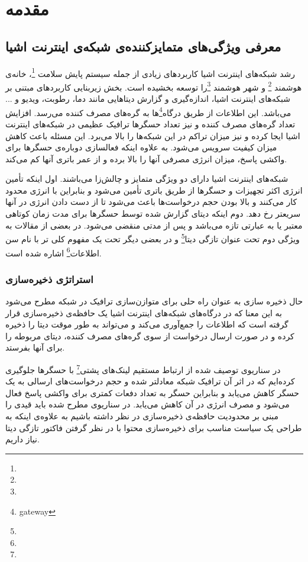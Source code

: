 
\chapter{مقدمه}
\section{معرفی ویژگی‌های متمایزکننده‌ی شبکه‌ی اینترنت اشیا}
رشد شبکه‌های اینترنت اشیا کاربردهای زیادی از جمله سیستم پایش سلامت \footnote{}،‌ خانه‌ی هوشمند \footnote{} و شهر هوشمند \footnote{}را توسعه بخشیده است. بخش زیربنایی کاربردهای مبتنی بر شبکه‌های اینترنت اشیا، اندازه‌گیری و گزارش دیتاهایی مانند دما، رطوبت، ویدیو و ... می‌باشد. این اطلاعات از طریق درگاه‌\footnote{gateway}ها به گره‌های مصرف کننده می‌رسد. افزایش تعداد گره‌های مصرف کننده و نیز تعداد حسگرها ترافیک عظیمی در شبکه‌های اینترنت اشیا ایجا کرده و نیز میزان تراکم در این شبکه‌ها را بالا می‌برد. این مسئله باعث کاهش میزان کیفیت سرویس می‌شود. به علاوه اینکه فعالسازی دوباره‌ی حسگرها برای واکشی پاسخ، میزان انرژی مصرفی آنها را بالا برده و از عمر باتری آنها کم می‌کند.

شبکه‌های اینترنت اشیا دارای دو ویژگی متمایز و چالش‌زا می‌باشند. اول اینکه تأمین انرژی اکثر تجهیزات و حسگرها از طریق باتری تأمین می‌شود و بنابراین با انرژی محدود کار می‌کنند و بالا بودن حجم درخواست‌ها باعث می‌شود تا از دست دادن انرژی در آنها سریعتر رخ دهد. دوم اینکه دیتای گزارش شده توسط حسگرها برای مدت زمان کوتاهی معتبر یا به عبارتی تازه می‌باشد و پس از مدتی منقضی می‌شود. در بعضی از مقالات به ویژگی دوم تحت عنوان تازگی دیتا\footnote{} و در بعضی دیگر تحت یک مفهوم کلی تر با نام سن اطلاعات\footnote{} اشاره شده است. 
\subsection{استراتژی ذخیره‌سازی}
حال ذخیره سازی به عنوان راه حلی برای متوازن‌سازی ترافیک در شبکه مطرح می‌شود به این معنا که در درگاه‌های شبکه‌های اینترنت اشیا یک حافظه‌ی ذخیره‌سازی قرار گرفته است که اطلاعات را جمع‌آوری می‌کند و می‌تواند به طور موقت دیتا را ذخیره کرده و در صورت ارسال درخواست از سوی گره‌های مصرف کننده، دیتای مربوطه را برای آنها بفرستد. 

در سناریوی توصیف شده از ارتباط مستقیم لینک‌های پشتی\footnote{} با حسگرها جلوگیری کرده‌ایم که در اثر آن ترافیک شبکه معادلتر شده و حجم درخواست‌های ارسالی به یک حسگر کاهش می‌یابد و بنابراین حسگر به تعداد دفعات کمتری برای واکشی پاسخ فعال می‌شود و مصرف انرژی در آن کاهش‌ می‌یابد. در سناریوی مطرح شده باید قیدی را مبنی بر محدودیت حافظه‌ی ذخیره‌سازی در نظر داشته باشیم به علاوه‌ی اینکه به طراحی یک سیاست مناسب برای ذخیره‌سازی محتوا با در نظر گرفتن فاکتور تازگی دیتا نیاز داریم.  

